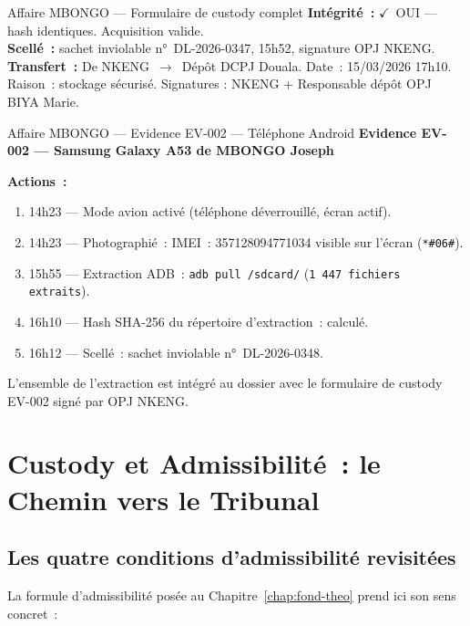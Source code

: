 \begin{boxscenario}{Affaire MBONGO --- Formulaire de custody complet}
\textbf{Intégrité~:} $\checkmark$~OUI --- hash identiques. Acquisition valide.\\

\textbf{Scellé~:} sachet inviolable n°~DL-2026-0347, 15h52, signature OPJ NKENG.\\

\textbf{Transfert~:} De NKENG~$\to$~Dépôt DCPJ Douala.
Date~: 15/03/2026 17h10. Raison~: stockage sécurisé. Signatures : NKENG +
Responsable dépôt OPJ BIYA Marie.
\end{boxscenario}

\begin{boxscenario}{Affaire MBONGO --- Evidence EV-002 --- Téléphone Android}
\textbf{Evidence EV-002 --- Samsung Galaxy A53 de MBONGO Joseph}

\textbf{Actions~:}
\begin{enumerate}
    \item 14h23 --- Mode avion activé (téléphone déverrouillé, écran actif).
    \item 14h23 --- Photographié~: IMEI~: 357128094771034 visible sur l'écran
          (\texttt{*\#06\#}).
    \item 15h55 --- Extraction ADB~: \texttt{adb pull /sdcard/}
          (\texttt{1~447 fichiers extraits}).
    \item 16h10 --- Hash SHA-256 du répertoire d'extraction~: calculé.
    \item 16h12 --- Scellé~: sachet inviolable n°~DL-2026-0348.
\end{enumerate}

L'ensemble de l'extraction est intégré au dossier avec le formulaire de
custody EV-002 signé par OPJ NKENG.
\end{boxscenario}

\section{Custody et Admissibilité~: le Chemin vers le Tribunal}
\label{sec:custody-admissibilite}

\subsection{Les quatre conditions d'admissibilité revisitées}

La formule d'admissibilité posée au Chapitre~\ref{chap:fond-theo} prend ici
son sens concret~:

